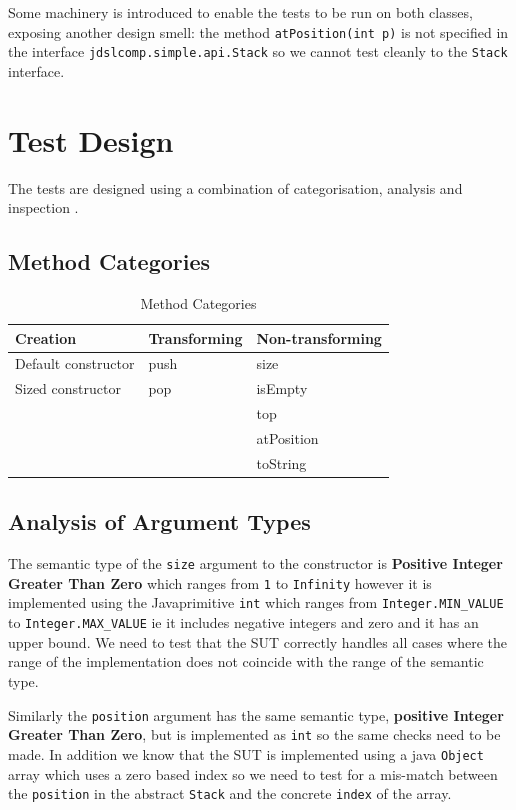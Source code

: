 \documentclass [12pt, a4paper, twoside, titlepage] {article}
\begin{document}
Some machinery is introduced to enable the tests to be run on both 
classes, exposing another design smell: the method \texttt{atPosition(int p)} is not specified in the 
interface \texttt{jdslcomp.simple.api.Stack} so we cannot test cleanly to the \texttt{Stack} interface.


\section{Test Design} 

The tests are designed using a combination of categorisation, analysis and inspection .
\subsection{Method Categories}

\begin{table}[!htbp]
\begin{tabular}{|lll|}
\hline
\bf{Creation} & \bf{Transforming} & \bf{Non-transforming} \\ 
\hline
Default constructor & push & size \\
Sized constructor & pop & isEmpty \\
&& top \\
&& atPosition\\
&& toString \\
\hline
\end{tabular}
\caption{Method Categories}
\label{tab:methodTypes}
\end{table}

\subsection{Analysis of Argument Types}
The semantic type of the \texttt{size} argument to the constructor is  \textbf{Positive Integer Greater Than Zero} which ranges from \texttt{1} to \texttt{Infinity} however it is implemented using the Java\texttrademark primitive \texttt{int} which ranges from \texttt{Integer.MIN\_VALUE} to \texttt{Integer.MAX\_VALUE} ie it includes negative integers and zero and it has an upper bound. 
We need to test that the SUT correctly handles all cases where the range of the implementation does not coincide with the range of the semantic type. 

Similarly the \texttt{position} argument has the same semantic type,   \textbf{positive Integer Greater Than Zero}, but is implemented as  \texttt{int}  so the same checks need to be made. In addition we know that the SUT is implemented using a java  \texttt{Object} array 
which uses a zero based index so we need to test for a mis-match between the \texttt{position} in the abstract \texttt{Stack} and the concrete \texttt{index} of the array.
\end{document}
